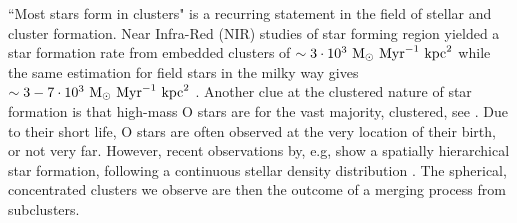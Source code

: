 ``Most stars form in clusters" is a recurring statement in the field of stellar and cluster formation. Near Infra-Red (NIR) studies of star forming region yielded a star formation rate from embedded clusters of $\sim 3\cdot10^3~{\textrm{M}_\odot} ~\textrm{Myr}^{-1}~ \textrm{kpc}^2$ \citep{Lada2003} while the same estimation for field stars in the milky way gives $\sim3-7\cdot10^3~{\textrm{M}_\odot}~\textrm{Myr}^{-1}~\textrm{kpc}^2$ \citep{Miller1979}. Another clue at the clustered nature of star formation is that high-mass O stars are for the vast majority, clustered, see \cite{DeWit2005}. Due to their short life, O stars are often observed at the very location of their birth, or not very far. However, recent observations by, e.g,  \cite{Gutermuth2011} show a spatially hierarchical star formation, following a continuous stellar density distribution \citep{Bressert2010}. The spherical, concentrated clusters we observe are then the outcome of a merging process from subclusters. 




%


%


